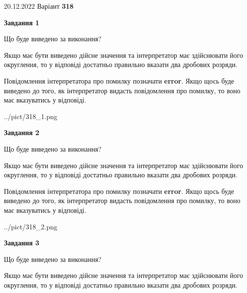 \documentclass[12pt, ukrainian]{article}
\begin{document}
{20.12.2022 Варіант \No \textbf { 318 }\par}
{
\begin {Large}

{\begin {center}\textbf{Завдання 1}\end {center}}\par
Що буде виведено за виконання? \par

Якщо має бути виведено дійсне значення та інтерпретатор має здійснювати його округлення, 
то у відповіді достатньо правильно вказати два дробових розряди.

Повідомлення інтерпретатора про помилку позначати \textbf{error}.
Якщо щось буде виведено до того, як інтерпретатор видасть повідомлення про помилку, 
то воно має вказуватись у відповіді. \par

\begin{center}
	{../pict/318_1.png}
\end{center}
\newpage

{\begin {center}\textbf{Завдання 2}\end {center}}\par
Що буде виведено за виконання? \par

Якщо має бути виведено дійсне значення та інтерпретатор має здійснювати його округлення, 
то у відповіді достатньо правильно вказати два дробових розряди.

Повідомлення інтерпретатора про помилку позначати \textbf{error}.
Якщо щось буде виведено до того, як інтерпретатор видасть повідомлення про помилку, 
то воно має вказуватись у відповіді. \par

\begin{center}
	{../pict/318_2.png}
\end{center}
\newpage

{\begin {center}\textbf{Завдання 3}\end {center}}\par
Що буде виведено за виконання? \par

Якщо має бути виведено дійсне значення та інтерпретатор має здійснювати його округлення, 
то у відповіді достатньо правильно вказати два дробових розряди.


\end{Large}}
\end{document}
